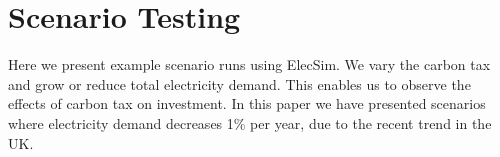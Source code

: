 
\section{Scenario Testing}


Here we present example scenario runs using ElecSim. We vary the carbon tax and grow or reduce total electricity demand. This enables us to observe the effects of carbon tax on investment. In this paper we have presented scenarios where electricity demand decreases 1\% per year, due to the recent trend in the UK.




